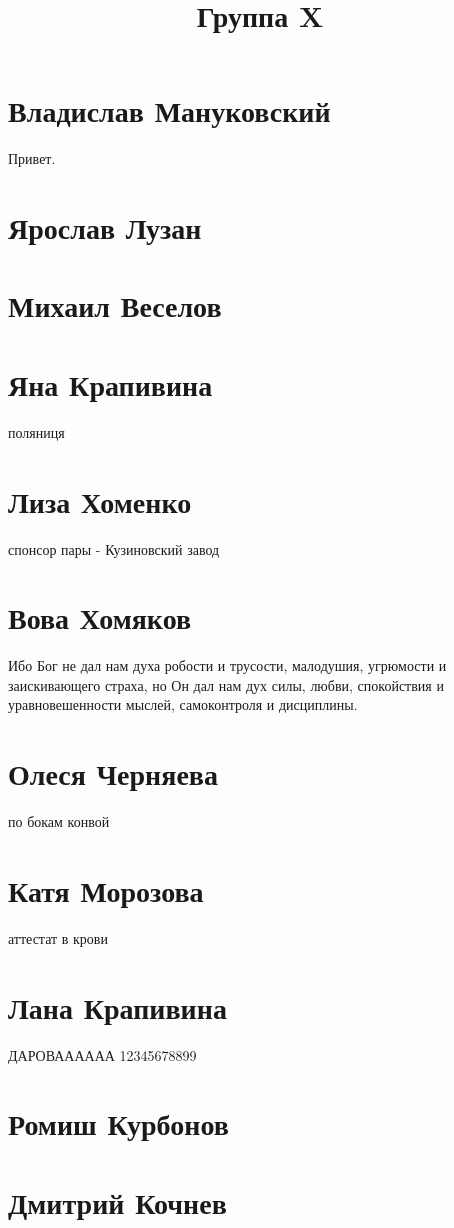 \documentclass{article}
\title{Группа X}
\begin{document}
\section*{Владислав Мануковский}
Привет.
\section*{Ярослав Лузан}

\section*{Михаил Веселов}

\section*{Яна Крапивина}

поляниця
\section*{Лиза Хоменко}
спонсор пары - Кузиновский завод

\section*{Вова Хомяков}
Ибо Бог не дал нам духа робости и трусости, малодушия, угрюмости и заискивающего страха, но Он дал нам дух силы, любви, спокойствия и уравновешенности мыслей, самоконтроля и дисциплины.
\section*{Олеся Черняева}
по бокам конвой

\section*{Катя Морозова}
аттестат в крови

\section*{Лана Крапивина}
ДАРОВАААААА 
12345678899
\section*{Ромиш Курбонов}

\section*{Дмитрий Кочнев}
\end{document}
